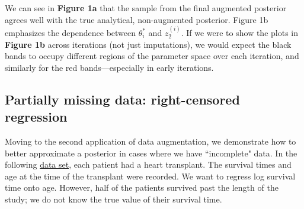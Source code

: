 \documentclass{article}
\begin{document}
We can see in \textbf{Figure 1a} that the sample from the final augmented posterior 
agrees well with the true analytical, non-augmented posterior. 
Figure 1b emphasizes the dependence between $\theta_i^{\ast}$ and $z_2^{(i)}.$
If we were to show the plots in \textbf{Figure 1b} across iterations (not just imputations),
we would expect the black bands to occupy different regions of the parameter space over each iteration,
and similarly for the red bands---especially in early iterations.
\pagebreak
\subsection{Partially missing data: right-censored regression}
Moving to the second application of data augmentation, we demonstrate how to better approximate 
a posterior in cases where we have ``incomplete" data.
In the following \href{https://www.openintro.org/data/index.php?data=heart_transplant}{data set}, each patient had a heart transplant. The survival times and age at the time of the transplant were recorded. 
We want to regress log survival time onto age. However, half of the patients survived past the length of the study; 
we do not know the true value of their survival time. 
\end{document}
